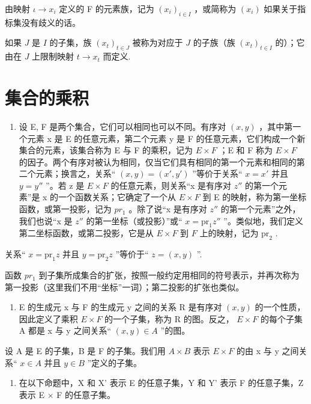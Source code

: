 由映射 \(\iota\to x_{i}\) 定义的 F 的元素族，记为 \((x_{i})_{i\in I}\) ，或简称为 \((x_{i})\) 如果关于指标集没有歧义的话。

如果 \(J\) 是 \(I\) 的子集，族 \((x_{t})_{t\in J}\) 被称为对应于 \(J\) 的子族（族 \((x_{t})_{t\in I}\) 的）；它由在 \(J\) 上限制映射 \(t\to x_t\) 而定义.

\section{集合的乘积}

\begin{enumerate}
\def\labelenumi{\arabic{enumi}.}
\tightlist
\item
  设 E, F 是两个集合，它们可以相同也可以不同。有序对 \((x, y)\) ，其中第一个元素 x 是 E 的任意元素，第二个元素 y 是 F 的任意元素，它们构成一个新集合的元素，该集合称为 E 与 F 的乘积，记为 \(E \times F\) ；E 和 F 称为 \(E \times F\) 的因子。两个有序对被认为相同，仅当它们具有相同的第一个元素和相同的第二个元素；换言之，关系“ \((x, y) = (x', y')\) ''等价于关系`` \(x = x'\) 并且 \(y = y''\) ”。若 z 是 \(E \times F\) 的任意元素，则关系“x 是有序对 \(z''\) 的第一个元素”是 x 的一个函数关系；它确定了一个从 \(E \times F\) 到 E 的映射，称为第一坐标函数，或第一投影，记为 \(pr_{1}\) 。除了说“x 是有序对 \(z''\) 的第一个元素”之外，我们也说“x 是 \(z''\) 的第一坐标（或投影）”或“ \(x = \mathrm{pr}_1z''\) ”。类似地，我们定义第二坐标函数，或第二投影，它是从 \(E \times F\) 到 \(F\) 上的映射，记为 \(\mathrm{pr}_2\) .
\end{enumerate}

关系“ \(x = \text{pr}_1 z\) 并且 \(y = \text{pr}_2 z\) ”等价于“ \(z = (x, y)\) ''.

函数 \(pr_{1}\) 到子集所成集合的扩张，按照一般约定用相同的符号表示，并再次称为第一投影（这里我们不用“坐标”一词）；第二投影的扩张也类似。

\begin{enumerate}
\def\labelenumi{\arabic{enumi}.}
\setcounter{enumi}{1}
\tightlist
\item
  E 的生成元 x 与 F 的生成元 y 之间的关系 R 是有序对 \((x, y)\) 的一个性质，因此定义了乘积 \(E \times F\) 的一个子集，称为 R 的图。反之， \(E \times F\) 的每个子集 A 都是 x 与 y 之间关系“ \((x, y) \in A\) ”的图。
\end{enumerate}

设 A 是 E 的子集，B 是 F 的子集。我们用 \(A \times B\) 表示 \(E \times F\) 的由 x 与 y 之间关系“ \(x \in A\) 并且 \(y \in B\) ”定义的子集。

\begin{enumerate}
\def\labelenumi{\arabic{enumi}.}
\setcounter{enumi}{2}
\tightlist
\item
  在以下命题中，X 和 X' 表示 E 的任意子集，Y 和 Y' 表示 F 的任意子集，Z 表示 E × F 的任意子集。
\end{enumerate}

